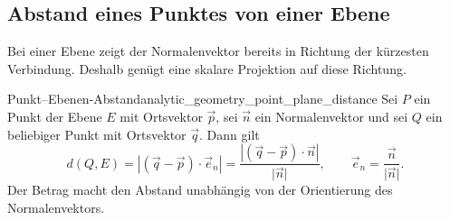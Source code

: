 \subsection{Abstand eines Punktes von einer Ebene}
\label{subsec:analytic_geometry_point_to_plane_distance}

Bei einer Ebene zeigt der Normalenvektor bereits in Richtung der kürzesten
Verbindung. Deshalb genügt eine skalare Projektion auf diese Richtung.

\begin{center}
\end{center}

\begin{TheoremBox}{Punkt--Ebenen-Abstand}{analytic_geometry_point_plane_distance}
  Sei $P$ ein Punkt der Ebene $E$ mit Ortsvektor $\vec p$, sei $\vec n$ ein
  Normalenvektor und sei $Q$ ein beliebiger Punkt mit Ortsvektor $\vec q$.
  Dann gilt
  \[
    d(Q,E)
    =\left\lvert(\vec q-\vec p)\cdot\vec e_n\right\rvert
    =\frac{\left\lvert(\vec q-\vec p)\cdot\vec n\right\rvert}
           {\lvert\vec n\rvert},
    \qquad
    \vec e_n=\frac{\vec n}{\lvert\vec n\rvert}.
  \]
  Der Betrag macht den Abstand unabhängig von der Orientierung des
  Normalenvektors.
\end{TheoremBox}

